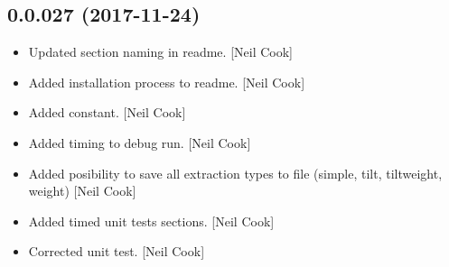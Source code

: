 \documentclass[a4paper,10pt,english]{report}
\begin{document}
\subsection{0.0.027 (2017-11-24)}
\label{\detokenize{misc/changelog:id524}}\begin{itemize}
\item {} 
Updated section naming in readme. {[}Neil Cook{]}

\item {} 
Added installation process to readme. {[}Neil Cook{]}

\item {} 
Added  constant. {[}Neil Cook{]}

\item {} 
Added timing to debug run. {[}Neil Cook{]}

\item {} 
Added posibility to save all extraction types to file (simple, tilt,
tiltweight, weight) {[}Neil Cook{]}

\item {} 
Added timed unit tests sections. {[}Neil Cook{]}

\item {} 
Corrected unit test. {[}Neil Cook{]}

\end{itemize}
\end{document}
